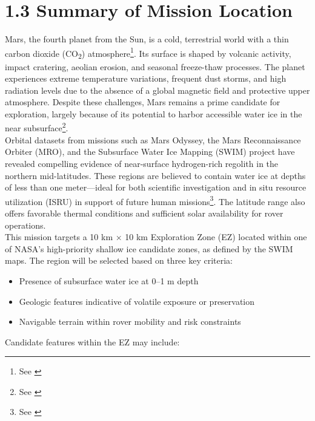 
\section*{1.3 Summary of Mission Location}

Mars, the fourth planet from the Sun, is a cold, terrestrial world with a thin carbon dioxide (CO\textsubscript{2}) atmosphere\footnote{See \cite{asu_2019_atmosphere}}. Its surface is shaped by volcanic activity, impact cratering, aeolian erosion, and seasonal freeze-thaw processes. The planet experiences extreme temperature variations, frequent dust storms, and high radiation levels due to the absence of a global magnetic field and protective upper atmosphere. Despite these challenges, Mars remains a prime candidate for exploration, largely because of its potential to harbor accessible water ice in the near subsurface\footnote{See \cite{nrc_2022_decadal}}.\\

Orbital datasets from missions such as Mars Odyssey, the Mars Reconnaissance Orbiter (MRO), and the Subsurface Water Ice Mapping (SWIM) project have revealed compelling evidence of near-surface hydrogen-rich regolith in the northern mid-latitudes. These regions are believed to contain water ice at depths of less than one meter—ideal for both scientific investigation and in situ resource utilization (ISRU) in support of future human missions\footnote{See \cite{bramson_2015_excess, mellon_1995_ground_ice}}. The latitude range also offers favorable thermal conditions and sufficient solar availability for rover operations.\\

This mission targets a 10 km × 10 km Exploration Zone (EZ) located within one of NASA’s high-priority shallow ice candidate zones, as defined by the SWIM maps. The region will be selected based on three key criteria:

\begin{itemize}
    \item Presence of subsurface water ice at 0–1 m depth
    \item Geologic features indicative of volatile exposure or preservation
    \item Navigable terrain within rover mobility and risk constraints
\end{itemize}

Candidate features within the EZ may include:

